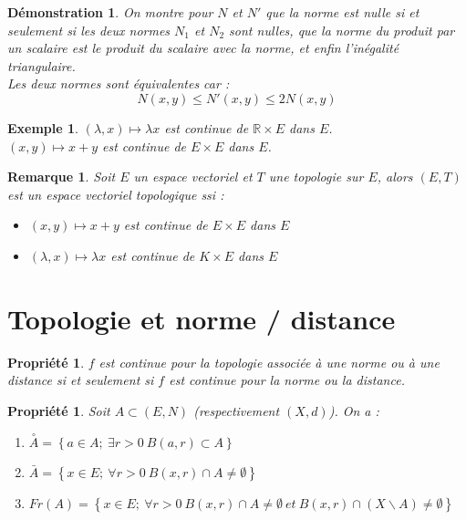 \documentclass[a4paper, oneside]{report}
\theoremstyle{break}
\newtheorem{propr}[thm]{Propriété}
\newtheorem{exem}[thm]{Exemple}
\newtheorem*{demo}{Démonstration}
\newtheorem{remar}[thm]{Remarque}
\newcommand{\x}{\times}
\newcommand{\R}{\mathbb{R}}
\newcommand{\ev}{espace vectoriel }
\newcommand{\cerc}[1]{\overset{\circ}{#1}}
\begin{document}
\begin{demo}
On montre pour $N$ et $N'$ que la norme est nulle si et seulement si les deux normes $N_1$ et $N_2$ sont nulles, que la norme du produit par un scalaire est le produit du scalaire avec la norme, et enfin l'inégalité triangulaire.\\
Les deux normes sont équivalentes car :
$$N(x,y) \leq N'(x,y) \leq 2N(x,y)$$
\end{demo}



\begin{exem}
$(\lambda , x)\mapsto \lambda x$ est continue de $\R \x E$ dans $E$.\\
$(x , y)\mapsto x+y$ est continue de $E \x E$ dans $E$.\\
\end{exem}


\begin{remar}
Soit $E$ un \ev et $T$ une topologie sur $E$, alors $(E,T)$ est un \ev topologique ssi :
\begin{itemize}
\item $(x,y) \mapsto x+y$ est continue de $E\x E$ dans $E$
\item $(\lambda , x) \mapsto \lambda x$ est continue de $K\x E$ dans $E$
\end{itemize}
\end{remar}

\section{Topologie et norme / distance}

\begin{propr}
$f$ est continue pour la topologie associée à une norme ou à une distance si et seulement si $f$ est continue pour la norme ou la distance.
\end{propr}


\begin{propr}
Soit $A \subset (E,N)$ (respectivement $(X,d)$). On a :
\begin{enumerate}
\item $\cerc{A} = \left\{a \in A;~\exists r >0~B(a,r)\subset A \right\}$
\item $\bar{A} = \left\{x\in E;~\forall r>0~ B(x,r) \cap A \neq \emptyset \right\}$
\item $Fr(A)=\left\{x\in E;~ \forall r>0~ B(x,r)\cap A\neq \emptyset~et~ B(x,r)\cap (X\backslash A)\neq \emptyset \right\}$
\end{enumerate}
\end{propr}
\end{document}
